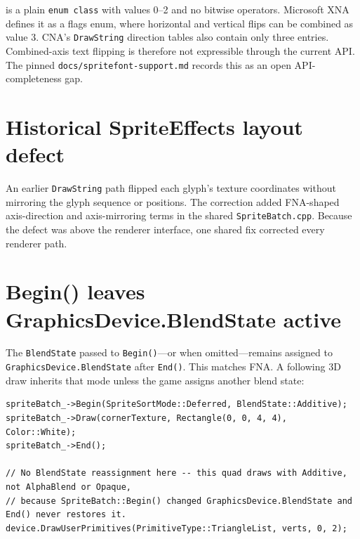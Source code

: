 \begin{limitationnote}
 is a plain \texttt{enum class} with values 0--2 and no bitwise
operators. Microsoft XNA defines it as a flags enum, where horizontal and vertical flips can be
combined as value 3. CNA's \texttt{DrawString} direction tables also contain only three entries.
Combined-axis text flipping is therefore not expressible through the current API. The pinned
\texttt{docs/spritefont-support.md} records this as an open API-completeness gap.
\end{limitationnote}

\section{Historical SpriteEffects layout defect}

\begin{historynote}
An earlier \texttt{DrawString} path flipped each glyph's texture coordinates without mirroring
the glyph sequence or positions. The correction added FNA-shaped axis-direction and
axis-mirroring terms in the shared \texttt{SpriteBatch.cpp}. Because the defect was above the
renderer interface, one shared fix corrected every renderer path.
\end{historynote}

\section{Begin() leaves GraphicsDevice.BlendState active}
\label{sec:spritebatch-blendstate-leak}

The \texttt{BlendState} passed to \texttt{Begin()}---or
 when omitted---remains assigned to
\texttt{GraphicsDevice.BlendState} after \texttt{End()}. This matches FNA. A following 3D draw
inherits that mode unless the game assigns another blend state:

\begin{lstlisting}
spriteBatch_->Begin(SpriteSortMode::Deferred, BlendState::Additive);
spriteBatch_->Draw(cornerTexture, Rectangle(0, 0, 4, 4), Color::White);
spriteBatch_->End();

// No BlendState reassignment here -- this quad draws with Additive, not AlphaBlend or Opaque,
// because SpriteBatch::Begin() changed GraphicsDevice.BlendState and End() never restores it.
device.DrawUserPrimitives(PrimitiveType::TriangleList, verts, 0, 2);
\end{lstlisting}

